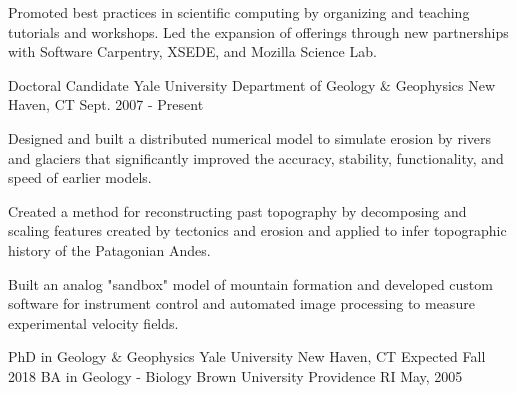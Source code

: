 \documentclass[11pt, letter]{awesome-cv}
\begin{document}
\begin{cventries}
{\begin{cvitems}
        \item {Promoted best practices in scientific computing by organizing and teaching tutorials and workshops. Led the expansion of offerings through new partnerships with Software Carpentry, XSEDE, and Mozilla Science Lab.}
      \end{cvitems}
    }
  \cventry
    {Doctoral Candidate}
    {Yale University Department of Geology \& Geophysics}
    {New Haven, CT}
    {Sept. 2007 - Present}
    {
      \begin{cvitems}
        \item {Designed and built a distributed numerical model to simulate erosion by rivers and glaciers that significantly improved the accuracy, stability, functionality, and speed of earlier models.}
        \item {Created a method for reconstructing past topography by decomposing and scaling features created by tectonics and erosion and applied to infer topographic history of the Patagonian Andes.}
        \item{Built an analog "sandbox" model of mountain formation and developed custom software for instrument control and automated image processing to measure experimental velocity fields.}
      \end{cvitems} 
    }
\end{cventries}

\begin{cventries}
  \cventry
    {PhD in Geology \& Geophysics}
    {Yale University}
    {New Haven, CT}
    {Expected Fall 2018}
    {}
  \cventry
    {BA in Geology - Biology}
    {Brown University}
    {Providence RI}
    {May, 2005}
    {}
\end{cventries}
\end{document}
